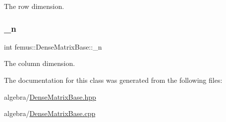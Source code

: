 The row dimension. 

\mbox{\label{classfemus_1_1_dense_matrix_base_aebd0d93543ce7468d69e3970b3c1471d}} 
\subsubsection{\texorpdfstring{\+\_\+n}{\_n}}
{\footnotesize\ttfamily int femus\+::\+Dense\+Matrix\+Base\+::\+\_\+n\hspace{0.3cm}{\ttfamily [protected]}}



The column dimension. 



The documentation for this class was generated from the following files\+:\begin{DoxyCompactItemize}
\item 
algebra/\mbox{\hyperlink{_dense_matrix_base_8hpp}{Dense\+Matrix\+Base.\+hpp}}\item 
algebra/\mbox{\hyperlink{_dense_matrix_base_8cpp}{Dense\+Matrix\+Base.\+cpp}}\end{DoxyCompactItemize}
